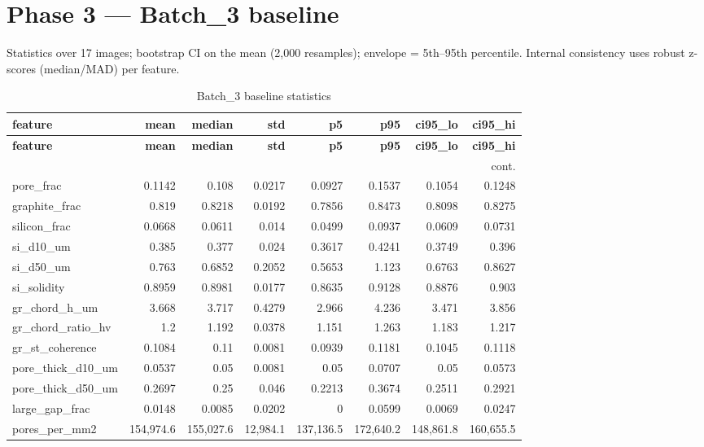 \documentclass[11pt,a4paper]{article}
\begin{document}
\section{Phase 3 --- Batch\_3 baseline}
Statistics over 17 images; bootstrap CI on the mean (2{,}000 resamples);
envelope = 5th--95th percentile. Internal consistency uses robust z-scores
(median/MAD) per feature.
\scriptsize
\begin{longtable}{lrrrrrrr}
\caption{Batch\_3 baseline statistics}\label{tab:baseline}\\
\toprule
\textbf{feature} & \textbf{mean} & \textbf{median} & \textbf{std} & \textbf{p5} & \textbf{p95} & \textbf{ci95\_lo} & \textbf{ci95\_hi} \\
\midrule
\endfirsthead
\toprule \textbf{feature} & \textbf{mean} & \textbf{median} & \textbf{std} & \textbf{p5} & \textbf{p95} & \textbf{ci95\_lo} & \textbf{ci95\_hi} \\
\midrule
\endhead
\midrule\multicolumn{8}{r}{\footnotesize cont.}\\\midrule\endfoot
\bottomrule\endlastfoot
pore\_frac & 0.1142 & 0.108 & 0.0217 & 0.0927 & 0.1537 & 0.1054 & 0.1248 \\
graphite\_frac & 0.819 & 0.8218 & 0.0192 & 0.7856 & 0.8473 & 0.8098 & 0.8275 \\
silicon\_frac & 0.0668 & 0.0611 & 0.014 & 0.0499 & 0.0937 & 0.0609 & 0.0731 \\
si\_d10\_um & 0.385 & 0.377 & 0.024 & 0.3617 & 0.4241 & 0.3749 & 0.396 \\
si\_d50\_um & 0.763 & 0.6852 & 0.2052 & 0.5653 & 1.123 & 0.6763 & 0.8627 \\
si\_solidity & 0.8959 & 0.8981 & 0.0177 & 0.8635 & 0.9128 & 0.8876 & 0.903 \\
gr\_chord\_h\_um & 3.668 & 3.717 & 0.4279 & 2.966 & 4.236 & 3.471 & 3.856 \\
gr\_chord\_ratio\_hv & 1.2 & 1.192 & 0.0378 & 1.151 & 1.263 & 1.183 & 1.217 \\
gr\_st\_coherence & 0.1084 & 0.11 & 0.0081 & 0.0939 & 0.1181 & 0.1045 & 0.1118 \\
pore\_thick\_d10\_um & 0.0537 & 0.05 & 0.0081 & 0.05 & 0.0707 & 0.05 & 0.0573 \\
pore\_thick\_d50\_um & 0.2697 & 0.25 & 0.046 & 0.2213 & 0.3674 & 0.2511 & 0.2921 \\
large\_gap\_frac & 0.0148 & 0.0085 & 0.0202 & 0 & 0.0599 & 0.0069 & 0.0247 \\
pores\_per\_mm2 & 154,974.6 & 155,027.6 & 12,984.1 & 137,136.5 & 172,640.2 & 148,861.8 & 160,655.5 \\

\end{longtable}
\end{document}

